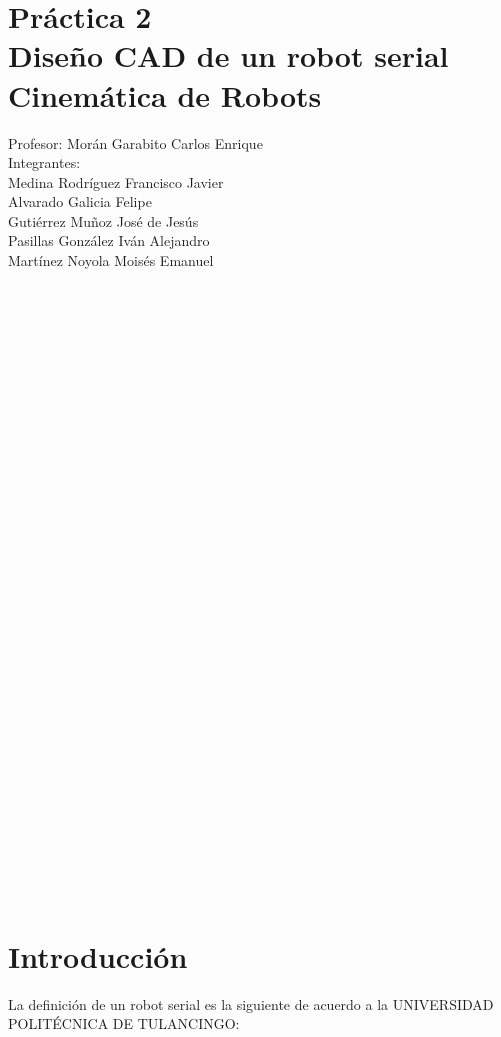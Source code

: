\documentclass[12pt,a4paper]{report}
\begin{document}
\section*{Práctica 2\\
Diseño CAD de un robot serial\\
Cinemática de Robots\\
}

Profesor: Morán Garabito Carlos Enrique\\
Integrantes:\\
Medina Rodríguez Francisco Javier\\
Alvarado Galicia Felipe\\
Gutiérrez Muñoz José de Jesús\\
Pasillas González Iván Alejandro\\
Martínez Noyola Moisés Emanuel\\
\\\\\\\\\\\\\\\\\\\\\\\\\\\\\\\\\\\\\\\\\\\\\\\\\\\\\\\\
\\\\\\\\
\section*{Introducción\\}

La definición de un robot serial es la siguiente de acuerdo a la UNIVERSIDAD POLITÉCNICA DE TULANCINGO:\\
\end{document}
